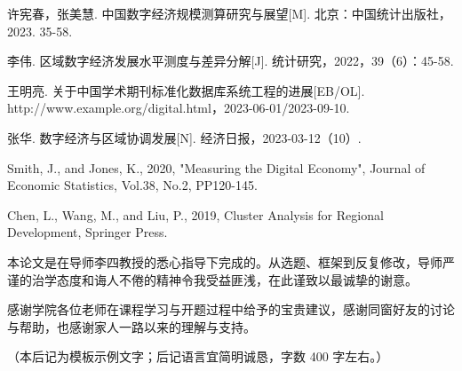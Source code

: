 \documentclass[master]{dufethesis}
\makeatletter
\newcommand{\addcite}[2]{\@namedef{cite@#1}{#2}}
\makeatother
\begin{document}
\mainmatter


\appendix


\backmatter

%

\begin{references}
    \item 许宪春，张美慧. 中国数字经济规模测算研究与展望[M]. 北京：中国统计出版社，2023. 35-58.
    \item 李伟. 区域数字经济发展水平测度与差异分解[J]. 统计研究，2022，39（6）：45-58.
    \item 王明亮. 关于中国学术期刊标准化数据库系统工程的进展[EB/OL]. http://www.example.org/digital.html，2023-06-01/2023-09-10.
    \item 张华. 数字经济与区域协调发展[N]. 经济日报，2023-03-12（10）.
    \item {\enref Smith, J., and Jones, K., 2020, "Measuring the Digital Economy", Journal of Economic Statistics, Vol.38, No.2, PP120-145.}
    \item {\enref Chen, L., Wang, M., and Liu, P., 2019, Cluster Analysis for Regional Development, Springer Press.}
\end{references}

\begin{acknowledgements}
本论文是在导师李四教授的悉心指导下完成的。从选题、框架到反复修改，导师严谨的治学态度和诲人不倦的精神令我受益匪浅，在此谨致以最诚挚的谢意。

感谢学院各位老师在课程学习与开题过程中给予的宝贵建议，感谢同窗好友的讨论与帮助，也感谢家人一路以来的理解与支持。

（本后记为模板示例文字；后记语言宜简明诚恳，字数 400 字左右。）
\end{acknowledgements}

\makedeclaration
\end{document}
